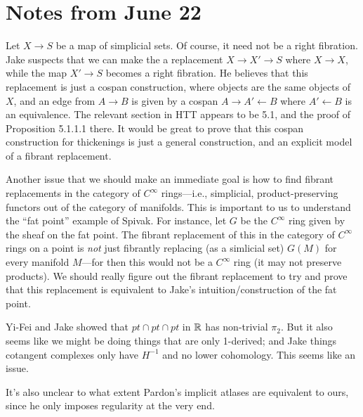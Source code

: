 

\section{Notes from June 22}

Let $X \to S$ be a map of simplicial sets. Of course, it need not be a right fibration. Jake suspects that we can make the a replacement $X \to X' \to S$ where $X \to X$, while the map $X' \to S$ becomes a right fibration. He believes that this replacement is just a cospan construction, where objects are the same objects of $X$, and an edge from $A \to B$ is given by a cospan $A \to A' \leftarrow B$ where $A' \leftarrow B$ is an equivalence. The relevant section in HTT appears to be 5.1, and the proof of Proposition 5.1.1.1 there. It would be great to prove that this cospan construction for thickenings is just a general construction, and an explicit model of a fibrant replacement.

Another issue that we should make an immediate goal is how to find fibrant replacements in the category of $C^\infty$ rings---i.e., simplicial, product-preserving functors out of the category of manifolds. This is important to us to understand the ``fat point'' example of Spivak. For instance, let $G$ be the $C^\infty$ ring given by the sheaf on the fat point. The fibrant replacement of this in the category of $C^\infty$ rings on a point is {\em not} just fibrantly replacing (as a simlicial set) $G(M)$ for every manifold $M$---for then this would not be a $C^\infty$ ring (it may not preserve products). We should really figure out the fibrant replacement to try and prove that this replacement is equivalent to Jake's intuition/construction of the fat point.

Yi-Fei and Jake showed that $pt \cap pt \cap pt$ in $\mathbb R$ has non-trivial $\pi_2$. But it also seems like we might be doing things that are only 1-derived; and Jake things cotangent complexes only have $H^{-1}$ and no lower cohomology. This seems like an issue. 

It's also unclear to what extent Pardon's implicit atlases are equivalent to ours, since he only imposes regularity at the very end.

\subsection{}

